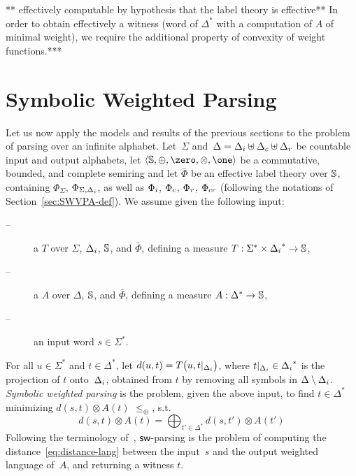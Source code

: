 \noindent
** effectively computable by hypothesis that the label theory is effective**
In order to obtain effectively a witness
(word of $\Delta^*$ with a computation of $A$ of minimal weight),
we require the additional property of convexity of weight functions.***






\section{Symbolic Weighted Parsing}
\label{sec:parsing}

Let us now apply the models and results of the previous sections %
to the problem of parsing over an infinite alphabet. %
%
%
Let~$\Sigma$
and~$\Delta = \Deltai \uplus \Deltac \uplus \Deltar$
be countable input and output alphabets,
let $\< \Semiring, \oplus, \zero, \otimes, \one>$ be a
commutative, bounded, and complete  semiring
and let $\bar\Phi$ be an effective label theory over $\mathbb{S}$,
containing $\Phi_\Sigma$, $\Phi_{\Sigma, \Deltai}$, as well as
$\Phii$, $\Phic$, $\Phir$, $\Phicr$
(following the notations of Section~\ref{sec:SWVPA-def}).
%
\noindent
We assume given the following input:
\begin{description}
\item[--] a \SWT $T$ over $\Sigma$, $\Deltai$, $\mathbb{S}$, and $\bar\Phi$,
defining a measure %
$T: \Sigma^* \times \Deltai^* \to \Semiring$,

\item[--] a \SWVPA $A$ over $\Delta$, $\mathbb{S}$, and $\bar\Phi$,
defining a measure $A: \Delta^* \to \mathbb{S}$,
\item[--] an input word $s \in \Sigma^*$.
\end{description}
%
For all $u \in \Sigma^*$ and $t \in \Delta^*$, let
\(d(u, t) = T\bigl(u, t|_\Deltai \bigr)\),
where $t|_\Deltai \in \Deltai^*$ is the projection of $t$ onto~$\Deltai$,
obtained from $t$ by removing all symbols in $\Delta \setminus \Deltai$.
%
\noindent
\emph{Symbolic weighted parsing} is the problem,
given the above input,
to find $t \in \Delta^*$ %
minimizing \( d(s, t) \otimes A(t)\)
\wrt $\leq_\oplus$,
\ie s.t. %
%
\begin{equation}\label{eq:distance-lang}
d(s, t) \otimes A(t) = \displaystyle\bigoplus_{t' \in \Delta^*} d(s, t') \otimes A(t')
\end{equation}
%
Following the terminology of~\cite{Mohri03EDWA},
$\textsf{sw}$-parsing is the problem of computing
the distance~\eqref{eq:distance-lang} between the input~$s$ and the output weighted language of~$A$,
and returning a witness $t$.

